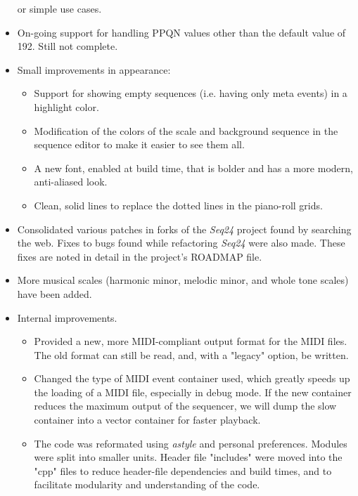 \documentclass[
 11pt,
 twoside,
 a4paper,
 headinclude,
 footinclude,
 final                                 %
]{article}
\begin{document}
\begin{itemize}
         or simple use cases.
      \item On-going support for handling PPQN values other than the
         default value of 192.  Still not complete.
      \item Small improvements in appearance:
      \begin{itemize}
         \item Support for showing empty sequences (i.e. having only meta
            events) in a highlight color.
         \item Modification of the colors of the scale and background sequence
            in the sequence editor to make it easier to see them all.
         \item A new font, enabled at build time, that is bolder and has a
            more modern, anti-aliased look.
         \item Clean, solid lines to replace the dotted lines in the piano-roll
            grids.
      \end{itemize}
      \item Consolidated various patches in forks of the \textsl{Seq24}
         project found by searching the web.  Fixes to bugs found while
         refactoring \textsl{Seq24} were also made.  These fixes are noted in
         detail in the project's ROADMAP file.
      \item More musical scales (harmonic minor, melodic minor, and
         whole tone scales) have been added.
      \item Internal improvements.
      \begin{itemize}
         \item Provided a new, more MIDI-compliant output format for the MIDI
            files.  The old format can still be read, and, with a "legacy" option,
            be written.
         \item Changed the type of MIDI event container used, which greatly speeds
            up the loading of a MIDI file, especially in debug mode.
            If the new container reduces the maximum output of the sequencer,
            we will dump the slow container into a vector container for faster
            playback.
         \item The code was reformated using \textsl{astyle} and
            personal preferences.  Modules were split into smaller units.
            Header file "includes" were moved into the "cpp" files to reduce
            header-file dependencies and build times, and to facilitate
            modularity and understanding of the code.

\end{itemize}
\end{itemize}
\end{document}
